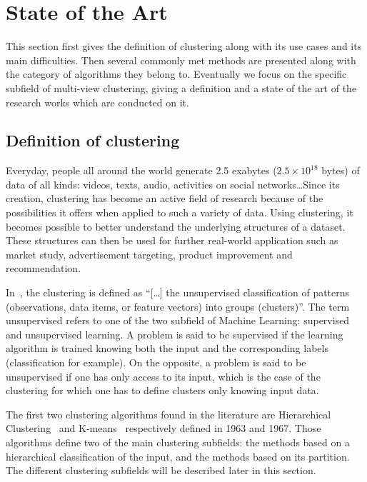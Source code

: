 %
\chapter{State of the Art}
This section first gives the definition of clustering along with its use cases and its main difficulties. Then several commonly met methods are presented along with the category of algorithms they belong to. Eventually we focus on the specific subfield of multi-view clustering, giving a definition and a state of the art of the research works which are conducted on it.

    \section{Definition of clustering}
    Everyday, people all around the world generate 2.5 exabytes ($2.5 \times 10^{18}$ bytes) of data of all kinds: videos, texts, audio, activities on social networks\ldots Since its creation, clustering has become an active field of research because of the possibilities it offers when applied to such a variety of data. Using clustering, it becomes possible to better understand the underlying structures of a dataset. These structures can then be used for further real-world application such as market study, advertisement targeting, product improvement and recommendation.

    In~\cite{jain1999data}, the clustering is defined as ``[\ldots] the unsupervised classification of patterns (observations, data items, or feature vectors) into groups (clusters)''. The term unsupervised refers to one of the two subfield of Machine Learning: supervised and unsupervised learning. A problem is said to be supervised if the learning algorithm is trained knowing both the input and the corresponding labels (classification for example). On the opposite, a problem is said to be unsupervised if one has only access to its input, which is the case of the clustering for which one has to define clusters only knowing input data.  

    The first two clustering algorithms found in the literature are Hierarchical Clustering~\cite{ward1963hierarchical} and K-means~\cite{macqueen1967some} respectively defined in 1963 and 1967. Those algorithms define two of the main clustering subfields: the methods based on a hierarchical classification of the input, and the methods based on its partition. The different clustering subfields will be described later in this section.

